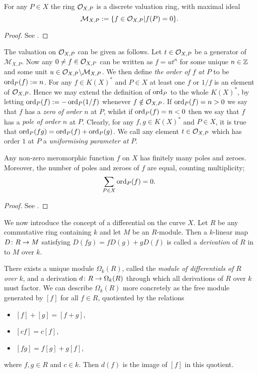     \begin{lem}
    For any $P \in X$ the ring ${\cal O}_{X,P}$ is a discrete valuation ring, with maximal ideal
        \[
        \mathcal {M}_{X,P} := \{ f \in {\cal O}_{X,P} | f(P) = 0 \}.
        \]
    \end{lem}
    \begin{proof}
    See \cite[Chap.\ 1, \S 4]{fulton}.
    \end{proof}

The valuation on ${\cal O}_{X,P}$ can be given as follows.
Let $t \in {\cal O}_{X,P}$ be a generator of $\mathcal{M}_{X,P}$.
Now any $0 \neq f \in {\cal O}_{X,P}$ can be written as $f = ut^n$ for some unique $n \in {\mathbb Z}$ and some unit $u \in {\cal O}_{X,P}\backslash \mathcal{M}_{X,P}$.
We then define \emph{the order of $f$ at $P$} to be $\operatorname{ord}_P(f) := n$.
For any $f \in K(X)^*$ and $P \in X$ at least one $f$ or $1/f$ is an element of $ {\cal O}_{X,P}$.
Hence we may extend the definition of $\operatorname{ord}_P$ to the whole $K(X)^*$, by letting $\operatorname{ord}_P(f) := - \operatorname{ord}_P(1/f)$ whenever $f \notin {\cal O}_{X,P}$.
If $\operatorname{ord}_P(f) = n >0$ we say that $f$ has a \emph{zero of order $n$} at $P$, whilst if $\operatorname{ord}_P(f) = n < 0$ then we say that $f$ has a \emph{pole of order $n$} at $P$.
Clearly, for any $f, g \in K(X)^*$ and $P \in X$, it is true that $\operatorname{ord}_P(fg) = \operatorname{ord}_P(f) + \operatorname{ord}_P(g)$.
We call any element $t \in {\cal O}_{X,P}$ which has order $1$ at $P$ a \emph{uniformising parameter at $P$}.

    \begin{prop}\label{propfinitelymanyzeroesandpoles}
    Any non-zero meromorphic function $f$ on $X$ has finitely many poles and zeroes.
    Moreover, the number of poles and zeroes of $f$ are equal, counting multiplicity; \ie 
        \[
        \sum_{P \in X} \operatorname{ord}_P(f) = 0.
        \]
    \end{prop}
    \begin{proof}
    See \cite[Chap.\ 8, \S 1, Prop.\ 1]{fulton}.
    \end{proof}


We now introduce the concept of a differential on the curve $X$.
Let $R$ be any commutative ring containing $k$ and let $M$ be an $R$-module.
Then a $k$-linear map $D \colon R \rightarrow M$ satisfying $D(fg) = fD(g) + gD(f)$ is called a \emph{derivation} of $R$ in to $M$ over $k$.

There exists a unique module $\Omega_k(R)$, called the \emph{module of differentials of $R$ over $k$}, and a derivation $d \colon R \rightarrow \Omega_k(R)$ through which all derivations of $R$ over $k$ must factor.
We can describe $\Omega_k(R)$ more concretely as the free module generated by $[f]$ for all $f \in R$, quotiented by the relations
    \begin{itemize}
    \item $[f]+[g] = [f+g]$,
    \item $[cf] = c[f]$,
    \item $[fg] = f[g] + g[f]$,
    \end{itemize}
where $f, g \in R$ and $c \in k$.
Then $d(f)$ is the image of $[f]$ in this quotient.

